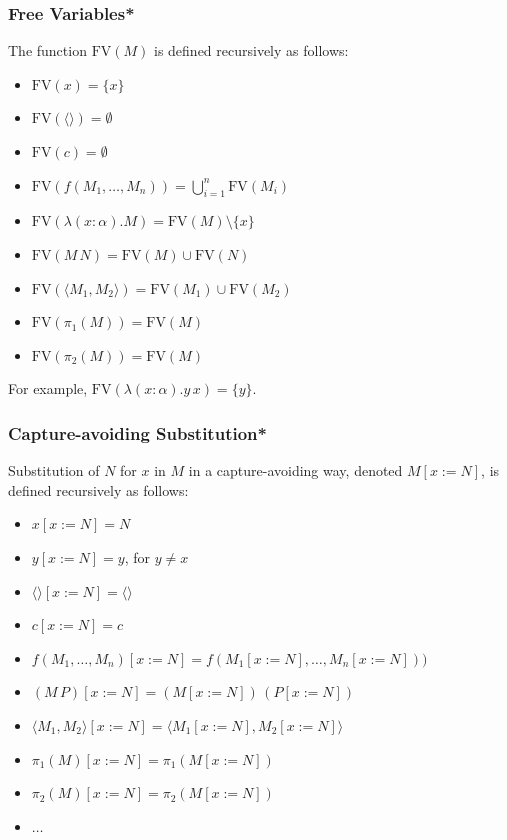 \documentclass[aspectratio=169]{beamer}
\begin{document}
\begin{frame}
\frametitle{Free Variables*}
The function $\text{FV}(M)$ is defined recursively as follows:
\begin{itemize}
    \item $\text{FV}(x) = \{x\}$
    \item $\text{FV}(\langle \rangle) = \emptyset$
    \item $\text{FV}(c) = \emptyset$
    \item $\text{FV}(f(M_1, \ldots, M_n)) = \bigcup_{i=1}^{n} \text{FV}(M_i)$
    \pause
    \item $\text{FV}(\lambda (x: \alpha). M) = \text{FV}(M) \setminus \{x\}$
    \pause
    \item $\text{FV}(M \, N) = \text{FV}(M) \cup \text{FV}(N)$
    \item $\text{FV}(\langle M_1, M_2 \rangle) = \text{FV}(M_1) \cup \text{FV}(M_2)$
    \item $\text{FV}(\pi_1(M)) = \text{FV}(M)$
    \item $\text{FV}(\pi_2(M)) = \text{FV}(M)$
\end{itemize}

\pause
For example, $\text{FV}(\lambda (x: \alpha). y \, x) = \{y\}$.

\end{frame}

\begin{frame}
\frametitle{Capture-avoiding Substitution*}

Substitution of $N$ for $x$ in $M$ in a capture-avoiding way, denoted $M[x := N]$, is defined recursively as follows:

\begin{itemize}
    \item $x[x := N] = N$
    \item $y[x := N] = y$, for $y \neq x$
    \pause
    \item $\langle \rangle[x := N] = \langle \rangle$
    \item $c[x := N] = c$
    \pause
    \item $f(M_1, \ldots, M_n)[x := N] = f(M_1[x := N], \ldots, M_n[x := N]))$
    \item $(M \, P)[x := N] = (M[x := N]) \, (P[x := N])$
    \item $\langle M_1 , M_2 \rangle[x := N] = \langle M_1[x := N], M_2[x := N] \rangle$
    \item $\pi_1(M)[x := N] = \pi_1(M[x := N])$
    \item $\pi_2(M)[x := N] = \pi_2(M[x := N])$
    \item $\ldots$
\end{itemize}
\end{frame}
\end{document}
